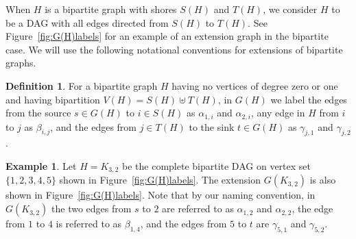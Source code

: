 \documentclass[12pt]{amsart}
\theoremstyle{definition}
\newtheorem{definition}[theorem]{Definition}
\newtheorem{example}[theorem]{Example}
\begin{document}
When $H$ is a bipartite graph with shores $S(H)$ and $T(H)$, we consider $H$ to be a DAG with all edges directed from $S(H)$ to $T(H)$.
See Figure~\ref{fig:G(H)labels} for an example of an extension graph in the bipartite case.
We will use the following notational conventions for extensions of bipartite graphs.

\begin{definition}\label{def:bipextension}
For a bipartite graph $H$ having no vertices of degree zero or one and having bipartition $V(H)=S(H) \uplus T(H)$, in $G(H)$ we label the edges from the source \(s\in G(H)\) to \(i\in S(H)\) as \(\alpha_{1,i}\) and \(\alpha_{2,i}\), any edge in \(H\) from \(i\) to \(j\) as \(\beta_{i,j}\), and the edges from \(j\in T(H)\) to the sink \(t\in G(H)\) as \(\gamma_{j,1}\) and \(\gamma_{j,2}\).
\end{definition}

\begin{example}\label{ex:G(H)}
Let $H=K_{3,2}$ be the complete bipartite DAG on vertex set $\{1,2,3,4,5\}$ shown in Figure~\ref{fig:G(H)labels}.
The extension $G(K_{3,2})$ is also shown in Figure~\ref{fig:G(H)labels}.
Note that by our naming convention, in $G(K_{3,2})$ the two edges from $s$ to $2$ are referred to as $\alpha_{1,2}$ and $\alpha_{2,2}$, the edge from $1$ to $4$ is referred to as $\beta_{1,4}$, and the edges from $5$ to $t$ are $\gamma_{5,1}$ and $\gamma_{5,2}$.
\end{example}   
\end{document}
